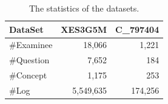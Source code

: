 \begin{table}[!t]
  \centering
  \caption{The statistics of the datasets.}
  \vspace{1pt}
  \renewcommand{\arraystretch}{1.3} %
  \setlength{\tabcolsep}{25pt}      %
  \begin{tabular}{lrr}             %
    \toprule
    DataSet    & XES3G5M   & C\_797404 \\
    \midrule
    \#Examinee & 18,066    & 1,221    \\
    \#Question & 7,652     & 184      \\
    \#Concept  & 1,175     & 253      \\
    \#Log      & 5,549,635 & 174,256  \\
    \bottomrule
  \end{tabular}
  \label{dataset}
  \vspace{-5mm}
\end{table}